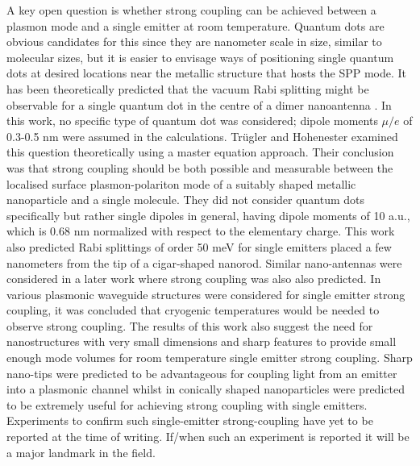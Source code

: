 \documentclass[12pt]{iopart}
\begin{document}
A key open question is whether strong coupling can be achieved between a plasmon mode and a single emitter at room temperature. Quantum dots are obvious candidates for this since they are nanometer scale in size, similar to molecular sizes, but it is easier to envisage ways of positioning single quantum dots at desired locations near the metallic structure that hosts the SPP mode. It has been theoretically predicted that the vacuum Rabi splitting might be observable for a single quantum dot in the centre of a dimer nanoantenna \cite{Savasta2010}. In this work, no specific type of quantum dot was considered; dipole moments $\mu/e$ of 0.3-0.5 nm were assumed in the calculations. Tr\"ugler and Hohenester \cite{Trugler_PRB_2008_77_115403} examined this question theoretically using a master equation approach. Their conclusion was that strong coupling should be both possible and measurable between the localised surface plasmon-polariton mode of a suitably shaped metallic nanoparticle and a single molecule. They did not consider quantum dots specifically but rather single dipoles in general, having dipole moments of 10 a.u., which is 0.68 nm normalized with respect to the elementary charge. This work also predicted Rabi splittings of order 50 meV for single emitters placed a few nanometers from the tip of a cigar-shaped nanorod. Similar nano-antennas were considered in a later work \cite{Slowik2013} where strong coupling was also also predicted. In \cite{Hummer2013} various plasmonic waveguide structures were considered for single emitter strong coupling, it was concluded that cryogenic temperatures would be needed to observe strong coupling. The results of this work \cite{Hummer2013} also suggest the need for nanostructures with very small dimensions and sharp features to provide small enough mode volumes for room temperature single emitter strong coupling. Sharp nano-tips were predicted to be advantageous for coupling light from an emitter into a plasmonic channel \cite{Chang2006} whilst in \cite{Agostino2013} conically shaped nanoparticles were predicted to be extremely useful for achieving strong coupling with single emitters. Experiments to confirm such single-emitter strong-coupling have yet to be reported at the time of writing. If/when such an experiment is reported it will be a major landmark in the field.
\end{document}
